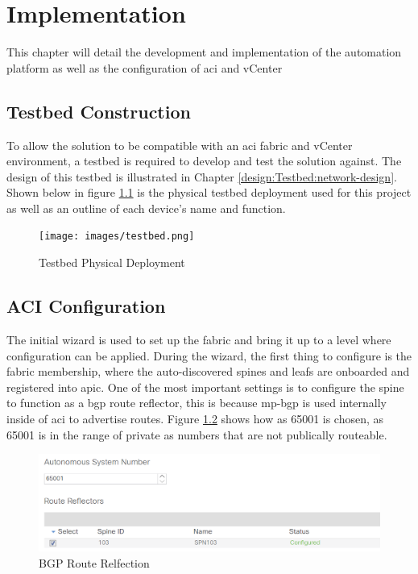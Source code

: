 \chapter{Implementation}
\label{chap:implementation}
This chapter will detail the development and implementation of the automation
platform as well as the configuration of \gls{aci} and vCenter
\section{Testbed Construction}
To allow the solution to be compatible with an \gls{aci} fabric and vCenter environment, a testbed is required to develop and test the solution against. The design of this testbed is illustrated in Chapter \ref{design:Testbed:network-design}. Shown below in figure \ref{fig:testbed} is the physical testbed deployment used for this project as well as an outline of each device's name and function.

\begin{figure}[H]
    
    \centering
    \texttt{[image: images/testbed.png]}
    
    \caption{Testbed Physical Deployment}
    \label{fig:testbed}
\end{figure}

\section{ACI Configuration}
The initial wizard is used to set up the fabric and bring it up to a level
where configuration can be applied. During the wizard, the first thing to
configure is the fabric membership, where the auto-discovered spines and leafs
are onboarded and registered into \gls{apic}.
One of the most important settings is to configure the spine to function as a
\gls{bgp} route reflector, this is because \gls{mp-bgp} is used internally inside of
\gls{aci} to advertise routes. Figure \ref{fig:bgp-reflection} shows how
\gls{as} 65001 is chosen, as 65001 is in the range of private \gls{as} numbers that are not publically routeable.

\begin{figure}[H]
    
    \centering
    \includegraphics[scale=0.5]{images/bgp-reflection.png}
    
    \caption{BGP Route Relfection}
    \label{fig:bgp-reflection}
\end{figure}

